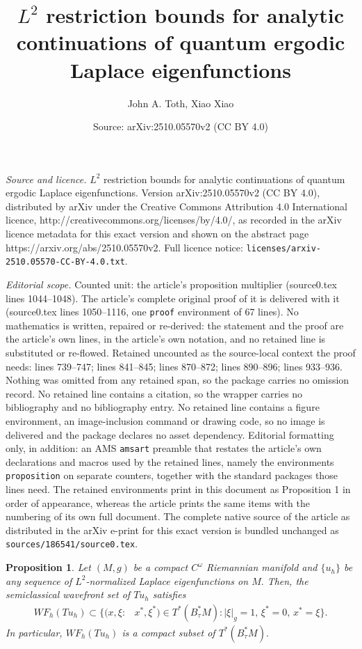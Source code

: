 \documentclass[10pt,a4paper]{amsart}
\title{$L^2$ restriction bounds for analytic continuations of quantum ergodic Laplace eigenfunctions}
\author{John A. Toth, Xiao Xiao}
\date{Source: arXiv:2510.05570v2 (CC BY 4.0)}
\newtheorem{proposition}{Proposition}
\begin{document}
\maketitle

\noindent\emph{Source and licence.} $L^2$ restriction bounds for analytic continuations of quantum ergodic Laplace eigenfunctions. Version arXiv:2510.05570v2 (CC BY 4.0), distributed by arXiv under the Creative Commons Attribution 4.0 International licence, http://creativecommons.org/licenses/by/4.0/, as recorded in the arXiv licence metadata for this exact version and shown on the abstract page https://arxiv.org/abs/2510.05570v2. Full licence notice: \texttt{licenses/arxiv-2510.05570-CC-BY-4.0.txt}.\par\smallskip

\noindent\textit{Editorial scope.} Counted unit: the article's proposition multiplier (source0.tex lines 1044--1048). The article's complete original proof of it is delivered with it (source0.tex lines 1050--1116, one \texttt{proof} environment of 67 lines). No mathematics is written, repaired or re-derived: the statement and the proof are the article's own lines, in the article's own notation, and no retained line is substituted or re-flowed.  Retained uncounted as the source-local context the proof needs: lines 739--747; lines 841--845; lines 870--872; lines 890--896; lines 933--936.  Nothing was omitted from any retained span, so the package carries no omission record.  No retained line contains a citation, so the wrapper carries no bibliography and no bibliography entry.  No retained line contains a figure environment, an image-inclusion command or drawing code, so no image is delivered and the package declares no asset dependency.  Editorial formatting only, in addition: an AMS \texttt{amsart} preamble that restates the article's own declarations and macros used by the retained lines, namely the environments \texttt{proposition} on separate counters, together with the standard packages those lines need.  The retained environments print in this document as Proposition 1 in order of appearance, whereas the article prints the same items with the numbering of its own full document.  The complete native source of the article as distributed in the arXiv e-print for this exact version is bundled unchanged as \texttt{sources/186541/source0.tex}.
\begin{proposition}\label{WF1}
Let $(M,g)$ be a compact $C^{\omega}$ Riemannian manifold and $\{ u_h \}$ be {\em any} sequence of $L^2$-normalized Laplace eigenfunctions on $M.$ Then, the semiclassical wavefront set of $Tu_h$ satisfies
    \begin{equation}\label{wf1}
        \begin{split}
            WF_h(Tu_h)\subset\big\{(x,\xi :&x^*,\xi^*)\in T^*(B_{\tau}^*M): |\xi|_g=1, \, \xi^* = 0, \, x^* = \xi \big\}.
            \end{split}
    \end{equation}
 In particular, $WF_h(Tu_h)$ is a  compact subset of $T^* (B_{\tau}^*M).$
\end{proposition}
\end{document}
